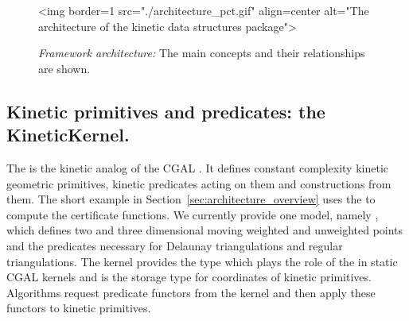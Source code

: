 \begin{figure}[htb]
\begin{ccHtmlOnly}
<img border=1 src="./architecture_pct.gif" align=center alt="The architecture of the kinetic data structures package">
\end{ccHtmlOnly}
\caption{ \label{fig:architecture} 
{\em Framework architecture:} The main concepts and their relationships are shown. }
\end{figure}



\subsection{Kinetic primitives and predicates: the KineticKernel.}
\label{sec:kinetic_kernel}

The  is the kinetic analog of the CGAL
. It defines constant complexity kinetic geometric
primitives, kinetic predicates acting on them and constructions from
them. The short example in Section~\ref{sec:architecture_overview}
uses the  to compute the 
certificate functions. We currently provide one model, namely
, which
defines two and three dimensional moving weighted and unweighted
points and the predicates necessary for Delaunay triangulations and
regular triangulations. The kernel provides the type 
which plays the role of the  in static
CGAL kernels and is the storage type for coordinates of kinetic
primitives. Algorithms request predicate functors from the kernel and
then apply these functors to kinetic primitives.


